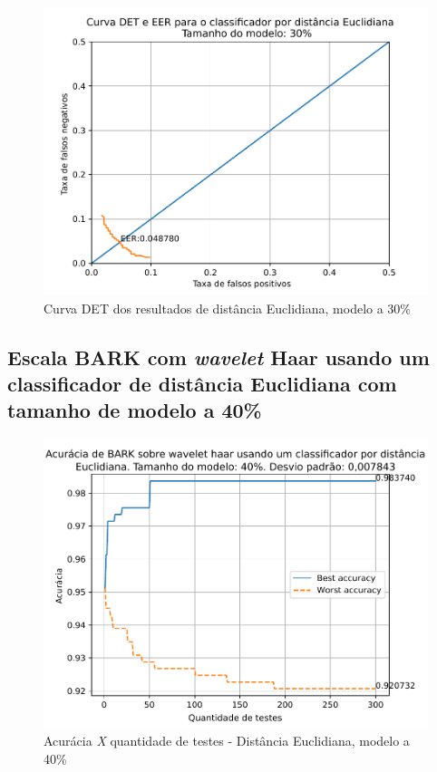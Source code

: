 			\begin{figure}[ht]
				\centering
				\includegraphics[width=\linewidth]{images/results/det/DET_for_classifier_Euclidian_30}
				\caption{Curva DET dos resultados de distância Euclidiana, modelo a 30\%}
				\label{fig:detforclassifiereuclidian30}
			\end{figure}

			\forceNewPage
		\subsection{Escala BARK com \textit{wavelet} Haar usando um classificador de distância Euclidiana com tamanho de modelo a 40\%}
		
			
			
			\begin{figure}[ht]
				\centering
				\includegraphics[width=\linewidth]{images/results/confusionMatrices/classifier_Euclidian_40}
				\caption{Acurácia \textit{X} quantidade de testes - Distância Euclidiana, modelo a 40\%}
				\label{fig:classifiereuclidian40}
			\end{figure}
		
